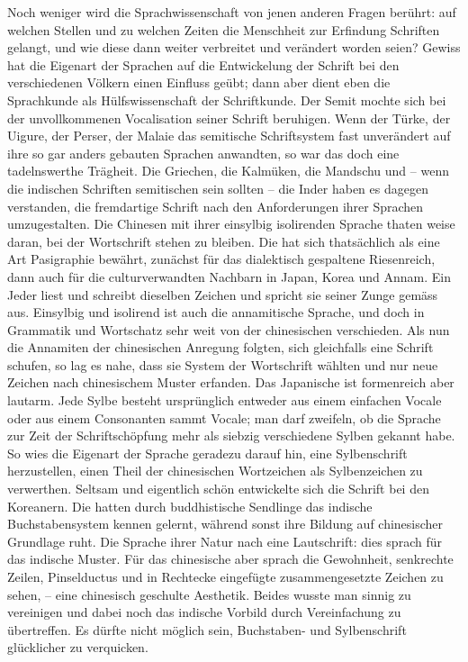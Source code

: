 Noch weniger wird die Sprachwissenschaft von jenen anderen Fragen berührt: auf welchen Stellen und zu welchen Zeiten die Menschheit zur Erfindung  Schriften gelangt, und wie diese dann weiter verbreitet und verändert worden seien? Gewiss hat die Eigenart der Sprachen auf die Entwickelung der Schrift bei den verschiedenen Völkern einen Einfluss geübt; dann aber dient eben die Sprachkunde als Hülfswissenschaft der Schriftkunde. Der Semit mochte sich bei der unvollkommenen Vocalisation seiner Schrift beruhigen. Wenn der Türke, der Uigure, der Perser, der Malaie das semitische Schriftsystem fast unverändert auf ihre so gar anders gebauten Sprachen anwandten, so war das doch eine tadelns\label{fp.138}werthe Trägheit. Die Griechen, die Kalmüken, die Mandschu und – wenn die indischen Schriften semitischen  sein sollten – die Inder haben es dagegen verstanden, die fremdartige Schrift nach den Anforderungen ihrer Sprachen umzugestalten. Die Chinesen mit ihrer einsylbig isolirenden Sprache thaten weise daran, bei der Wortschrift stehen zu bleiben. Die hat sich thatsächlich als eine Art Pasigraphie bewährt, zunächst für das dialektisch gespaltene Riesenreich, dann auch für die culturverwandten Nachbarn in Japan, Korea und Annam. Ein Jeder liest und schreibt dieselben Zeichen und spricht sie seiner Zunge gemäss aus. Einsylbig und isolirend ist auch die annamitische Sprache, und doch in Grammatik und Wortschatz sehr weit von der chinesischen verschieden. Als nun die Annamiten der chinesischen Anregung folgten, sich gleichfalls eine Schrift schufen, so lag es nahe, dass sie  System der Wortschrift wählten und nur neue Zeichen nach chinesischem Muster erfanden. Das Japanische ist formenreich aber lautarm. Jede Sylbe besteht ursprünglich entweder aus einem einfachen Vocale oder aus einem Consonanten sammt Vocale; man darf zweifeln, ob die Sprache zur Zeit der Schriftschöpfung mehr als siebzig verschiedene Sylben gekannt habe. So wies die Eigenart der Sprache geradezu darauf hin, eine Sylbenschrift herzustellen, einen Theil der chinesischen Wortzeichen als Sylbenzeichen zu verwerthen. Seltsam \label{sp.130} und eigentlich schön entwickelte sich die Schrift bei den Koreanern. Die hatten durch buddhistische Sendlinge das indische Buchstabensystem kennen gelernt, während sonst ihre Bildung auf chinesischer Grundlage ruht. Die Sprache  ihrer Natur nach eine Lautschrift: dies sprach für das indische Muster. Für das chinesische aber sprach die Gewohnheit, senkrechte Zeilen, Pinselductus und in Rechtecke eingefügte zusammengesetzte Zeichen zu sehen, – eine chinesisch geschulte Aesthetik. Beides wusste man sinnig zu vereinigen und dabei noch das indische Vorbild durch Vereinfachung zu übertreffen. Es dürfte nicht möglich sein, Buchstaben- und Sylbenschrift glücklicher  zu verquicken.

